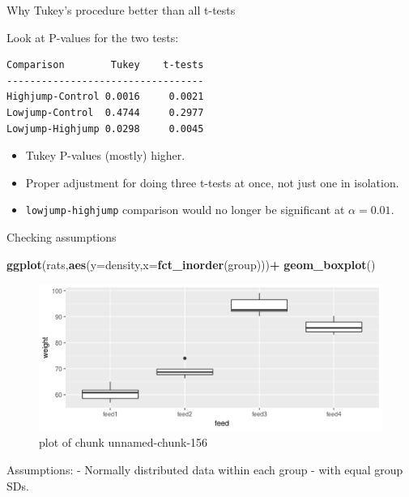 \documentclass[ignorenonframetext,]{beamer}
\newenvironment{Shaded}{\begin{snugshade}}{\end{snugshade}}
\newcommand{\DataTypeTok}[1]{\textcolor[rgb]{0.13,0.29,0.53}{#1}}
\newcommand{\KeywordTok}[1]{\textcolor[rgb]{0.13,0.29,0.53}{\textbf{#1}}}
\newcommand{\NormalTok}[1]{#1}
\newcommand{\OperatorTok}[1]{\textcolor[rgb]{0.81,0.36,0.00}{\textbf{#1}}}
\providecommand{\tightlist}{%
  \setlength{\itemsep}{0pt}\setlength{\parskip}{0pt}}
\begin{document}
\begin{frame}[fragile]{Why Tukey's procedure better than all t-tests}
\protect\hypertarget{why-tukeys-procedure-better-than-all-t-tests}{}

Look at P-values for the two tests:

\begin{verbatim}
Comparison        Tukey    t-tests
----------------------------------
Highjump-Control 0.0016     0.0021
Lowjump-Control  0.4744     0.2977
Lowjump-Highjump 0.0298     0.0045
\end{verbatim}

\begin{itemize}
\tightlist
\item
  Tukey P-values (mostly) higher.
\item
  Proper adjustment for doing three t-tests at once, not just one in
  isolation.
\item
  \texttt{lowjump-highjump} comparison would no longer be significant at
  \(\alpha = 0.01\).
\end{itemize}

\end{frame}

\begin{frame}[fragile]{Checking assumptions}
\protect\hypertarget{checking-assumptions}{}

\begin{Shaded}
\begin{Highlighting}[]
\KeywordTok{ggplot}\NormalTok{(rats,}\KeywordTok{aes}\NormalTok{(}\DataTypeTok{y=}\NormalTok{density,}\DataTypeTok{x=}\KeywordTok{fct_inorder}\NormalTok{(group)))}\OperatorTok{+}
\KeywordTok{geom_boxplot}\NormalTok{()}
\end{Highlighting}
\end{Shaded}

\begin{figure}
\centering
\includegraphics{figure/unnamed-chunk-156-1.png}
\caption{plot of chunk unnamed-chunk-156}
\end{figure}

Assumptions: - Normally distributed data within each group - with equal
group SDs.

\end{frame}
\end{document}
